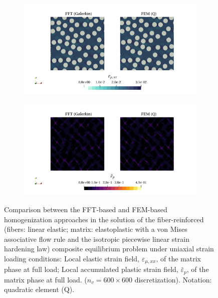 \begin{figure}[hbt]
  \centering
	\begin{subfigure}[b]{\textwidth}
    \centering
    \includegraphics[width=\textwidth]{figures/von_mises_res_mat_small_strain_2D_normal_elastic_strain_11}
    \caption{}
    \label{subfig:von_mises_res_mat_small_strain_2D_normal_elastic_strain_11}
  \end{subfigure}
  \begin{subfigure}[b]{\textwidth}
    \centering
    \includegraphics[width=\textwidth]{figures/von_mises_res_mat_small_strain_2D_normal_palstic_strain_11}
    \caption{}
    \label{subfig:von_mises_res_mat_small_strain_2D_normal_palstic_strain_11}
  \end{subfigure}
  \caption{Comparison between the FFT-based and FEM-based homogenization approaches in the
  solution of the fiber-reinforced (fibers: linear elastic; matrix: elastoplastic with a von Mises associative flow rule and the isotropic piecewise linear strain hardening law) composite equilibrium problem under uniaxial
  strain loading conditions:  Local elastic strain field, \(\varepsilon_{\mu,xx}\), of the matrix phase at full load;  Local accumulated plastic strain field, \(\bar{\varepsilon}_{p}\), of the matrix phase at full load.  (\(n_v = 600 \times 600\) discretization). Notation: quadratic element (Q).}
\label{fig:von_mises_res_mat_small_strain_2D_normal_local_fields}
\end{figure}


